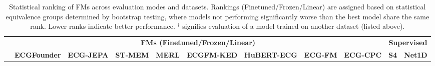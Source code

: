 \documentclass{article}
\begin{document}
            \begin{table}[htbp]
                \centering
                \tiny
                \setlength{\tabcolsep}{2pt} %
                \caption{Statistical ranking of FMs across evaluation modes and datasets. Rankings (Finetuned/Frozen/Linear) are assigned based on statistical equivalence groups determined by bootstrap testing, where models not performing significantly worse than the best model share the same rank. Lower ranks indicate better performance. ${}^\dagger$ signifies evaluation of a model trained on another dataset (listed above).}
                \label{tab:detailed_ranking_table}
                \begin{tabular}{lcccccccccc}
                    \toprule
                    & \multicolumn{8}{c}{\textbf{FMs (Finetuned/Frozen/Linear)}} &\multicolumn{2}{c}{\textbf{Supervised}} \\
                    \cmidrule(l){2-9}\cmidrule(l){10-11}
                     & \textbf{ECGFounder} & \textbf{ECG-JEPA} & \textbf{ST-MEM} & \textbf{MERL} & \textbf{ECGFM-KED} & \textbf{HuBERT-ECG} & \textbf{ECG-FM} & \textbf{ECG-CPC} & \textbf{S4} & \textbf{Net1D} \\
                    \midrule
                    

\end{tabular}
\end{table}
\end{document}
